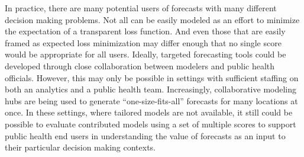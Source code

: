 \documentclass{article}\usepackage[]{graphicx}\usepackage[]{xcolor}
\begin{document}
In practice, there are many potential users of forecasts with many different decision making problems.
Not all can be easily modeled as an effort to minimize the expectation of a transparent loss function.
And even those that are easily framed as expected loss minimization may differ enough that no single score would be 
appropriate for all users.
Ideally, targeted forecasting tools could be developed through close collaboration between modelers and public health officials.
However, this may only be possible in settings with sufficient staffing on both an analytics and a public health team.
Increasingly, collaborative modeling hubs are being used to generate ``one-size-fits-all'' forecasts for many locations at once.
In these settings, where tailored models are not available, it still could be possible to evaluate contributed models using a set of multiple scores to support public health end users in understanding the value of forecasts as an input to their particular decision making contexts.


\end{document}
